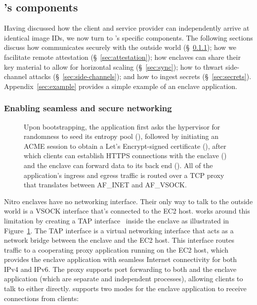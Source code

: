 \subsection{\Tool{}'s components}%
\label{sec:framework}

Having discussed how the client and service provider can independently arrive at
identical image IDs, we now turn to \tool{}'s specific components.  The
following sections discuss how \tool{}
communicates securely with the outside world (\S~\ref{sec:networking});
how we facilitate remote attestation (\S~\ref{sec:attestation});
how enclaves can share their key material to allow for horizontal scaling (\S~\ref{sec:sync});
how to thwart side-channel attacks (\S~\ref{sec:side-channels}); and
how to ingest secrets (\S~\ref{sec:secrets}).
Appendix~\ref{sec:example} provides a simple example of an enclave application.

\subsubsection{Enabling seamless and secure networking}%
\label{sec:networking}

\begin{figure}[t]
  \centering
  
  \caption{Upon bootstrapping, the application first asks the hypervisor for
    randomness to seed its entropy pool (), followed by initiating an
    ACME session to obtain a Let's Encrypt-signed certificate (), after
    which clients can establish HTTPS connections with the enclave ()
    and the enclave can forward data to its back end ().  All of the
    application's ingress and egress  traffic is routed over a TCP proxy that
    translates between AF\_INET and AF\_VSOCK.}
  \label{fig:networking}
\end{figure}

Nitro enclaves have no networking interface.  Their only way to talk to the
outside world is a VSOCK interface that's connected to the EC2 host.  \Tool{}
works around this limitation by creating a TAP interface~\cite{tun-tap} inside
the enclave as illustrated in Figure~\ref{fig:networking}.  The TAP interface is
a virtual networking interface that acts as a network bridge between the enclave
and the EC2 host.  This interface routes traffic to a cooperating proxy
application running on the EC2 host, which provides the enclave application with
seamless Internet connectivity for both IPv4 and IPv6.  The proxy supports port
forwarding to both \tool{} and the enclave application (which are separate and
independent processes), allowing clients to talk to either directly.  \Tool{}
supports two modes for the enclave application to receive connections from
clients:

